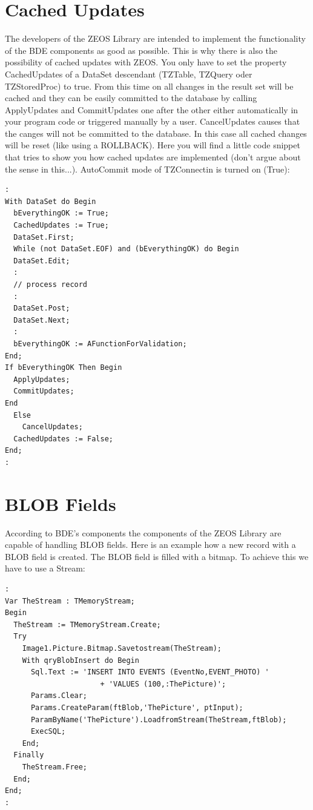 \documentclass[a4paper,12pt,oneside]{book}
\begin{document}
\chapter{Cached Updates}
The developers of the ZEOS Library are intended to implement the functionality of the BDE components as good as possible.
This is why there is also the possibility of cached updates with ZEOS.
You only have to set the property CachedUpdates of a DataSet descendant (TZTable, TZQuery oder TZStoredProc) to true.
From this time on all changes in the result set will be cached and they can be easily committed to the database by calling ApplyUpdates and CommitUpdates one after the other either automatically in your program code or triggered manually by a user.
CancelUpdates causes that the canges will not be committed to the database.
In this case all cached changes will be reset (like using a ROLLBACK).
Here you will find a little code snippet that tries to show you how cached updates are implemented (don't argue about the sense in this...).
AutoCommit mode of TZConnectin is turned on (True):

\begin{verbatim}
:
With DataSet do Begin
  bEverythingOK := True;
  CachedUpdates := True;
  DataSet.First;
  While (not DataSet.EOF) and (bEverythingOK) do Begin
  DataSet.Edit;
  :
  // process record
  :
  DataSet.Post;
  DataSet.Next;
  :
  bEverythingOK := AFunctionForValidation;
End;
If bEverythingOK Then Begin
  ApplyUpdates;
  CommitUpdates;
End
  Else
    CancelUpdates;
  CachedUpdates := False;
End;
:
\end{verbatim}
\chapter{BLOB Fields}
According to BDE's components the components of the ZEOS Library are capable of handling BLOB fields.
Here is an example how a new record with a BLOB field is created.
The BLOB field is filled with a bitmap.
To achieve this we have to use a Stream:
\begin{verbatim}
:
Var TheStream : TMemoryStream;
Begin
  TheStream := TMemoryStream.Create;
  Try
    Image1.Picture.Bitmap.Savetostream(TheStream);
    With qryBlobInsert do Begin
      Sql.Text := 'INSERT INTO EVENTS (EventNo,EVENT_PHOTO) ' 
			          + 'VALUES (100,:ThePicture)';
      Params.Clear;
      Params.CreateParam(ftBlob,'ThePicture', ptInput);
      ParamByName('ThePicture').LoadfromStream(TheStream,ftBlob);
      ExecSQL;
    End;
  Finally
    TheStream.Free;
  End;
End;
:
\end{verbatim}
\end{document}
